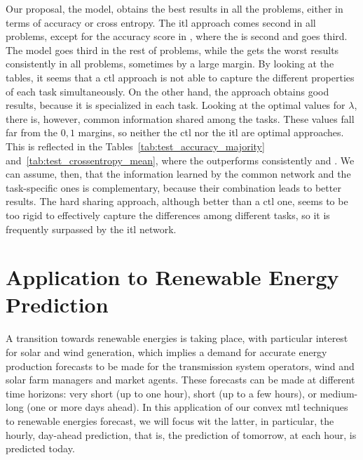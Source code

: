 Our proposal, the  model, obtains the best results in all the problems, either in terms of accuracy or cross entropy.
The \acrshort{itl} approach comes second in all problems, except for the accuracy score in , where the  is second and  goes third.
The  model goes third in the rest of problems, while the  gets the worst results consistently in all problems, sometimes by a large margin.
%
By looking at the tables, it seems that a \acrshort{ctl} approach is not able to capture the different properties of each task simultaneously. On the other hand, the  approach obtains good results, because it is specialized in each task.
Looking at the optimal values for $\lambda$, there is, however, common information shared among the tasks. These values fall far from the $0, 1$ margins, so neither the \acrshort{ctl} nor the \acrshort{itl} are optimal approaches. This is reflected in the Tables~\ref{tab:test_accuracy_majority} and~\ref{tab:test_crossentropy_mean}, where the  outperforms consistently  and . We can assume, then, that the information learned by the common network and the task-specific ones is complementary, because their combination leads to better results.
%
The hard sharing approach, although better than a \acrshort{ctl} one, seems to be too rigid to effectively capture the differences among different tasks, so it is frequently surpassed by the \acrshort{itl} network.







\section{Application to Renewable Energy Prediction}\label{sec:convexmlt_renewable}

A transition towards renewable energies is taking place, with particular interest for solar and wind generation, which implies a demand for accurate energy production forecasts to be made for the transmission system operators, wind and solar farm managers and market agents. These forecasts can be made at different time horizons: very short (up to one hour), short (up to a few hours), or medium-long (one or more days ahead).
In this application of our convex \acrshort{mtl} techniques to renewable energies forecast, we will focus wit the latter, in particular, the hourly, day-ahead prediction, that is, the prediction of tomorrow, at each hour, is predicted today.

